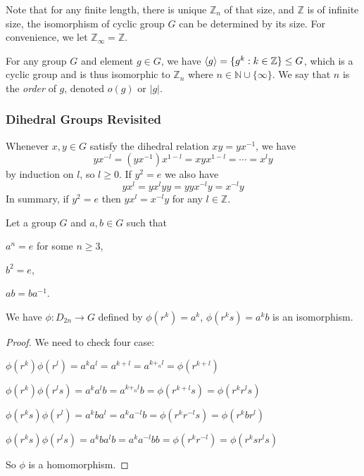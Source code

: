\documentclass[12pt]{article}
\begin{document}
Note that for any finite length, there is unique $\mathbb{Z}_n$ of that size,
and $\mathbb{Z}$ is of infinite size, the isomorphism of cyclic group $G$
can be determined by its size.
For convenience, we let $\mathbb{Z}_\infty = \mathbb{Z}$.

\begin{definition}
    For any group $G$ and element $g \in G$,
    we have $\langle{g}\rangle = \{g^k : k \in \mathbb{Z}\} \le G$,
    which is a cyclic group and is thus isomorphic to $\mathbb{Z}_n$ where $n \in \mathbb{N}\cup\{\infty\}$.
    We say that $n$ is the \emph{order} of $g$, denoted $o(g)$ or $|g|$.
\end{definition}

\subsubsection*{Dihedral Groups Revisited}

Whenever $x,y \in G$ satisfy the dihedral relation
$xy = yx^{-1}$, we have
\[
yx^{-l} = (yx^{-1})x^{1-l} = xyx^{1-l} = \cdots = x^{l}y
\]
by induction on $l$, so $l \ge 0$.
If $y^{2} = e$ we also have
\[
yx^{l} = yx^{l}yy = yyx^{-l}y = x^{-l}y
\]
In summary, if $y^{2} = e$ then $yx^{l} = x^{-l}y$ for any $l \in \mathbb{Z}$.

\begin{lemma}
    Let a group $G$ and $a,b \in G$ such that
    \begin{compactenum}[(i)]
    \item $a^{n} = e$ for some $n \ge 3$,
    \item $b^{2} = e$,
    \item $ab = ba^{-1}$.
    \end{compactenum}
    We have $\phi : D_{2n} \to G$ defined by $\phi(r^{k}) = a^{k}$, $\phi(r^{k}s) = a^{k}b$
    is an isomorphism.
\end{lemma}
\begin{proof}
    We need to check four case:
    \begin{compactenum}
    \item $\phi(r^{k})\phi(r^{l}) = a^{k}a^{l} = a^{k+l} = a^{k+_nl} = \phi(r^{k+l})$
    \item $\phi(r^{k})\phi(r^{l}s) = a^{k}a^{l}b = a^{k+_nl}b = \phi(r^{k+l}s) = \phi(r^{k}r^{l}s)$
    \item $\phi(r^{k}s)\phi(r^{l}) = a^{k}ba^{l} = a^{k}a^{-l}b = \phi(r^{k}r^{-l}s)= \phi(r^{k}br^{l})$
    \item $\phi(r^{k}s)\phi(r^{l}s) = a^{k}ba^{l}b = a^{k}a^{-l}bb = \phi(r^{k}r^{-l})= \phi(r^{k}sr^{l}s)$
    \end{compactenum}
    So $\phi$ is a homomorphism.
\end{proof}
\end{document}
